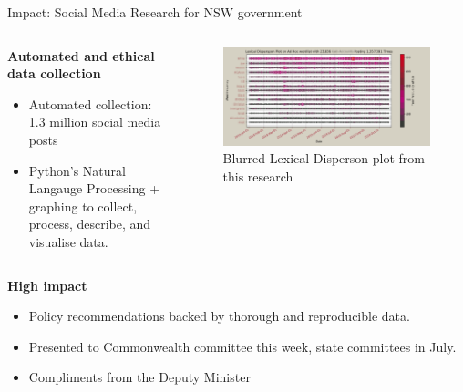 \documentclass[aspectratio=169, 11pt]{beamer} %
\begin{document}
\begin{frame}{Impact: Social Media Research for NSW government}
\begin{columns}[t]
\begin{column}{.35\textwidth}
\textbf{Automated and ethical data collection}
\begin{itemize}
    \item Automated collection: 1.3 million social media posts
    \item Python's Natural Langauge Processing + graphing to collect, process, describe, and visualise data.
\end{itemize}

\end{column}
\begin{column}{.55\textwidth}
\begin{figure}
    \vspace{-.5cm}
    \centering
    \includegraphics[width=\textwidth]{figures/blur.png}
    \caption{Blurred Lexical Disperson plot from this research}
\end{figure}
\end{column}
\end{columns}
\textbf{High impact}
\begin{itemize}
    \item Policy recommendations backed by thorough and reproducible data. 
    \item Presented to Commonwealth committee this week, state committees in July.
    \item Compliments from the Deputy Minister
    
    
\end{itemize}
\end{frame}
\end{document}
